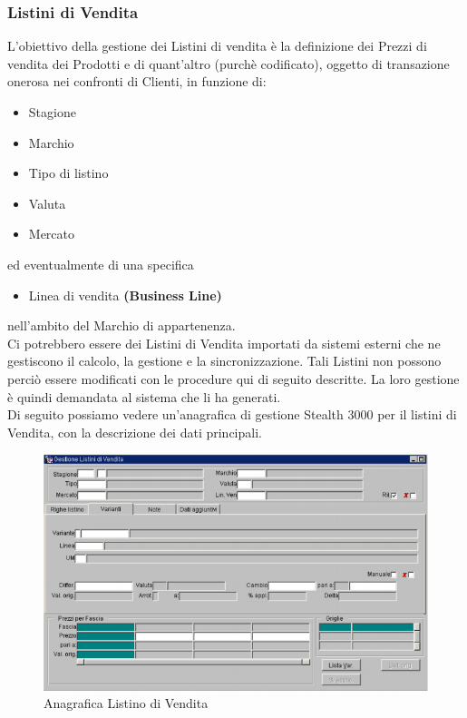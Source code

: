 \subsubsection{Listini di Vendita}
L'obiettivo della gestione dei Listini di vendita è la definizione dei Prezzi di vendita dei Prodotti e di quant’altro (purchè codificato), oggetto di transazione onerosa nei confronti di Clienti, in funzione di:
\begin{itemize}
\item Stagione
\item Marchio
\item Tipo di listino
\item Valuta
\item Mercato
\end{itemize}
ed eventualmente di una specifica
\begin{itemize}
\item Linea di vendita \textbf{(Business Line)}
\end{itemize}
nell’ambito del Marchio di appartenenza.\\
Ci potrebbero essere dei Listini di Vendita importati da sistemi esterni che ne gestiscono il calcolo, la gestione e la sincronizzazione. Tali Listini non possono perciò essere modificati con le procedure qui di seguito descritte. La loro gestione è quindi demandata al sistema che li ha generati.\\
Di seguito possiamo vedere un'anagrafica di gestione Stealth 3000 per il listini di Vendita, con la descrizione dei dati principali.\\

\begin{figure}[!h]
\thispagestyle{empty}
\centering
\includegraphics[scale=0.90]{img/Listino.png}
\caption{Anagrafica Listino di Vendita}
\end{figure}
\newpage

